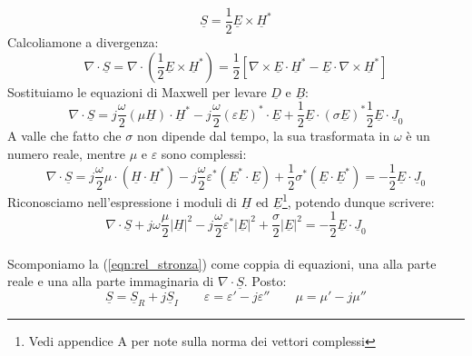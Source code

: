 \documentclass{book}
\begin{document}
        \begin{equation}
            \underline{S}=\frac{1}{2}\underline{E} \times \underline{H}^{*}
        \end{equation}
        Calcoliamone a divergenza:
        \begin{equation}
            \nabla \cdot \underline{S} = \nabla \cdot (\frac{1}{2}\underline{E} \times \underline{H}^{*}) = \frac{1}{2}[\nabla \times \underline{E} \cdot \underline{H}^{*}- \underline{E} \cdot \nabla \times \underline{H}^{*}]
        \end{equation}
        Sostituiamo le equazioni di Maxwell per levare $\underline{D}$ e $\underline{B}$:
        \begin{equation}
            \nabla \cdot \underline{S} = j \frac{\omega}{2}(\mu \underline{H}) \cdot \underline{H}^{*}-j \frac{\omega}{2}(\varepsilon \underline{E})^{*}\cdot \underline{E} + \frac{1}{2}\underline{E} \cdot (\sigma \underline{E})^{*}  \frac{1}{2}\underline{E} \cdot \underline{J}_{0} 
        \end{equation}
        A valle che fatto che $\sigma$ non dipende dal tempo, la sua trasformata in $\omega$ è un numero reale, mentre $\mu$ e $\varepsilon$ sono complessi:
        \begin{equation}
            \nabla \cdot \underline{S} = j \frac{\omega}{2}\mu\cdot  (\underline{H} \cdot \underline{H}^{*})-j \frac{\omega}{2}\varepsilon^{*} (\underline{E}^{*}\cdot \underline{E}) + \frac{1}{2}\sigma^{*}(\underline{E} \cdot  \underline{E}^{*}) = -\frac{1}{2} \underline{E}\cdot \underline{J}_{0}
        \end{equation}
        Riconosciamo nell'espressione i moduli di $\underline{H} $ ed $ \underline{E}$\footnote{Vedi appendice A per note sulla norma dei vettori complessi}, potendo dunque scrivere:
        \begin{equation}
        \label{eqn:rel_stronza}
            \nabla \cdot \underline{S} +j \omega \frac{\mu}{2}|\underline{H}|^{2}-j \frac{\omega}{2}\varepsilon^{*}|\underline{E}|^{2}+\frac{\sigma}{2}|\underline{E}|^{2}=-\frac{1}{2}\underline{E} \cdot \underline{J}_{0}
        \end{equation} \\
        Scomponiamo la (\ref{eqn:rel_stronza}) come coppia di equazioni, una alla parte reale e una alla parte immaginaria di $\nabla \cdot \underline{S}$. Posto:
        \begin{equation}
            \underline{S}=\underline{S}_{R}+j\underline{S}_{I} \qquad \varepsilon=\varepsilon'-j\varepsilon'' \qquad \mu = \mu'-j\mu''
        \end{equation}
\end{document}
